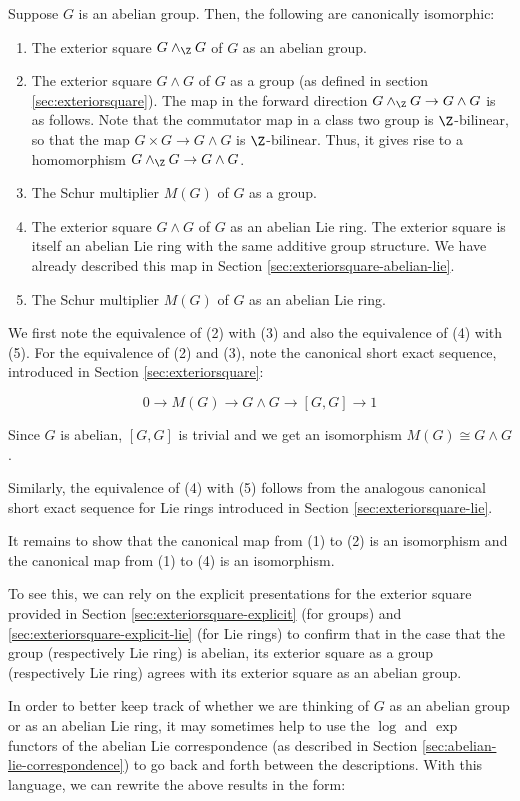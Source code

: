 \documentclass{ucetd}
\begin{document}
Suppose $G$ is an abelian group. Then, the following are canonically
isomorphic:

\begin{enumerate}
\item The exterior square $G \wedge_\Z G$ of $G$ as an abelian group.
\item The exterior square $G \wedge G$ of $G$ as a group (as defined
  in section \ref{sec:exteriorsquare}). The map in the forward
  direction $G \wedge_\Z G \to G \wedge G$ is as follows. Note that
  the commutator map in a class two group is $\Z$-bilinear, so that
  the map $G \times G \to G \wedge G$ is $\Z$-bilinear. Thus, it gives
  rise to a homomorphism $G \wedge_\Z G \to G \wedge G$.
\item The Schur multiplier $M(G)$ of $G$ as a group.
\item The exterior square $G \wedge G$ of $G$ as an abelian Lie
  ring. The exterior square is itself an abelian Lie ring with the
  same additive group structure. We have already described this map in
  Section \ref{sec:exteriorsquare-abelian-lie}.
\item The Schur multiplier $M(G)$ of $G$ as an abelian Lie ring.
\end{enumerate}

We first note the equivalence of (2) with (3) and also the equivalence
of (4) with (5). For the equivalence of (2) and (3), note the
canonical short exact sequence, introduced in Section
\ref{sec:exteriorsquare}:

$$0 \to M(G) \to G \wedge G \to [G,G] \to 1$$

Since $G$ is abelian, $[G,G]$ is trivial and we get an isomorphism
$M(G) \cong G \wedge G$.

Similarly, the equivalence of (4) with (5) follows from the analogous
canonical short exact sequence for Lie rings introduced in Section
\ref{sec:exteriorsquare-lie}.

It remains to show that the canonical map from (1) to (2) is an
isomorphism and the canonical map from (1) to (4) is an isomorphism.

To see this, we can rely on the explicit presentations for the
exterior square provided in Section \ref{sec:exteriorsquare-explicit}
(for groups) and \ref{sec:exteriorsquare-explicit-lie} (for Lie rings)
to confirm that in the case that the group (respectively Lie ring) is
abelian, its exterior square as a group (respectively Lie ring) agrees
with its exterior square as an abelian group.

In order to better keep track of whether we are thinking of $G$ as an
abelian group or as an abelian Lie ring, it may sometimes help to use
the $\log$ and $\exp$ functors of the abelian Lie correspondence (as
described in Section \ref{sec:abelian-lie-correspondence}) to go back
and forth between the descriptions. With this language, we can rewrite
the above results in the form:
\end{document}
